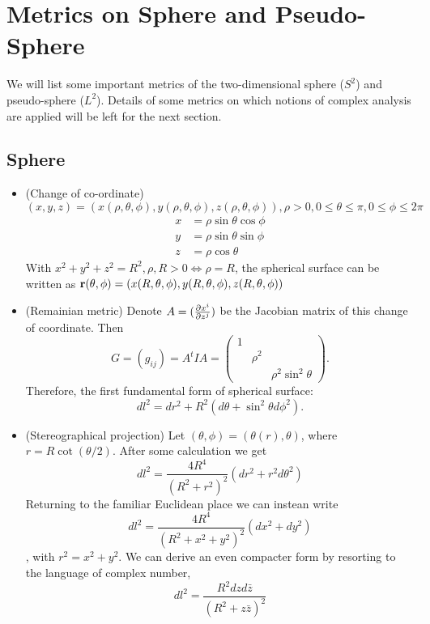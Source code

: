 \section{Metrics on Sphere and Pseudo-Sphere}
We will list some important metrics of the two-dimensional sphere ($S^2$) and pseudo-sphere ($L^2$). Details of some metrics on which notions of complex analysis are applied will be left for the next section.

\subsection{Sphere}
\begin{itemize}
	\item (Change of co-ordinate)
	$(x, y, z) = (x(\rho, \theta, \phi), y(\rho, \theta, \phi), z(\rho, \theta, \phi)), \rho > 0, 0\leq \theta \leq \pi, 0 \leq \phi \leq 2\pi$
	\begin{align}
	x &= \rho \sin\theta \cos\phi \\
	y &= \rho \sin\theta \sin\phi \\
	z &= \rho \cos\theta
	\end{align}
	With $x^2 + y^2 + z^2 = R^2, \rho, R>0 \iff \rho = R $, the spherical surface can be written as $\mathbf{r}(\theta, \phi) = (x( R, \theta, \phi), y(R, \theta, \phi), z(R, \theta, \phi))$
	
	\item (Remainian metric)  Denote $A = (\frac{ \partial x^i}{ \partial z^j })$ be the Jacobian matrix of this change of coordinate. Then \[G = (g_{ij}) = A^tIA = \begin{pmatrix}
		1 &     & \\
		  & \rho^2 & \\
		  &     & \rho^2\sin^2\theta 
	\end{pmatrix}.\] Therefore, the first fundamental form of spherical surface: 
	\begin{equation}
	dl^2 = dr^2 + R^2(d\theta + \sin^2\theta d\phi^2).
	\end{equation}
	
	\item (Stereographical projection)
	Let $(\theta, \phi) = (\theta(r), \theta)$, where $r = R \cot(\theta/2)$. After some calculation we get \begin{equation}
	dl^2 = \frac{4R^4}{(R^2 + r^2)^2} (dr^2 + r^2d\theta^2)
	\end{equation}
	Returning to the familiar Euclidean place we can instean write
	\begin{equation}
	dl^2 = \frac{4R^4}{(R^2 + x^2 + y^2)^2} (dx^2 + dy^2)
	\end{equation}
	, with $r^2 = x^2 + y^2.$ We can derive an even compacter form by resorting to the language of complex number, \begin{equation}
	dl^2 = \frac{R^2 dz d\bar{z}}{(R^2 + z\bar{z})^2}
	\end{equation}
	
\end{itemize}

